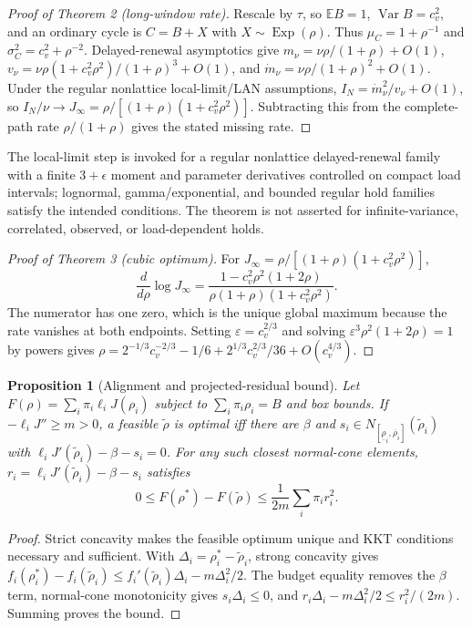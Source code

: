 \documentclass[10pt]{article}
\newtheorem{proposition}{Proposition}
\begin{document}
\begin{proof}[Proof of Theorem 2 (long-window rate)]
Rescale by $\tau$, so $\mathbb EB=1$, $\operatorname{Var}B=c_v^2$, and an
ordinary cycle is $C=B+X$ with $X\sim\operatorname{Exp}(\rho)$. Thus
$\mu_C=1+\rho^{-1}$ and $\sigma_C^2=c_v^2+\rho^{-2}$. Delayed-renewal
asymptotics give $m_\nu=\nu\rho/(1+\rho)+O(1)$,
$v_\nu=\nu\rho(1+c_v^2\rho^2)/(1+\rho)^3+O(1)$, and
$\dot m_\nu=\nu\rho/(1+\rho)^2+O(1)$. Under the regular nonlattice
local-limit/LAN assumptions, $I_N=\dot m_\nu^2/v_\nu+O(1)$, so
$I_N/\nu\to J_\infty=\rho/[(1+\rho)(1+c_v^2\rho^2)]$. Subtracting this
from the complete-path rate $\rho/(1+\rho)$ gives the stated missing rate.
\end{proof}

The local-limit step is invoked for a regular nonlattice delayed-renewal family
with a finite $3+\epsilon$ moment and parameter derivatives controlled on
compact load intervals; lognormal, gamma/exponential, and bounded regular hold
families satisfy the intended conditions. The theorem is not asserted for
infinite-variance, correlated, observed, or load-dependent holds.

\begin{proof}[Proof of Theorem 3 (cubic optimum)]
For $J_\infty=\rho/[(1+\rho)(1+c_v^2\rho^2)]$,
\[
\frac{d}{d\rho}\log J_\infty=\frac{1-c_v^2\rho^2(1+2\rho)}
{\rho(1+\rho)(1+c_v^2\rho^2)}.
\]
The numerator has one zero, which is the unique global maximum because the
rate vanishes at both endpoints. Setting $\varepsilon=c_v^{2/3}$ and solving
$\varepsilon^3\rho^2(1+2\rho)=1$ by powers gives
$\rho=2^{-1/3}c_v^{-2/3}-1/6+2^{1/3}c_v^{2/3}/36+O(c_v^{4/3})$.
\end{proof}

\begin{proposition}[Alignment and projected-residual bound]
\label{prop:s-alignment-summary}
Let $F(\rho)=\sum_i\pi_i\ell_iJ(\rho_i)$ subject to
$\sum_i\pi_i\rho_i=B$ and box bounds. If $-\ell_iJ''\ge m>0$, a feasible
$\widetilde\rho$ is optimal iff there are $\beta$ and
$s_i\in N_{[\underline\rho_i,\overline\rho_i]}(\widetilde\rho_i)$ with
$\ell_iJ'(\widetilde\rho_i)-\beta-s_i=0$. For any such closest normal-cone
elements, $r_i=\ell_iJ'(\widetilde\rho_i)-\beta-s_i$ satisfies
\[
0\le F(\rho^*)-F(\widetilde\rho)\le\frac1{2m}\sum_i\pi_i r_i^2.
\]
\end{proposition}

\begin{proof}
Strict concavity makes the feasible optimum unique and KKT conditions
necessary and sufficient. With $\Delta_i=\rho_i^*-\widetilde\rho_i$, strong
concavity gives $f_i(\rho_i^*)-f_i(\widetilde\rho_i)\le
f_i'(\widetilde\rho_i)\Delta_i-m\Delta_i^2/2$. The budget equality removes
the $\beta$ term, normal-cone monotonicity gives $s_i\Delta_i\le0$, and
$r_i\Delta_i-m\Delta_i^2/2\le r_i^2/(2m)$. Summing proves the bound.
\end{proof}



\end{document}
